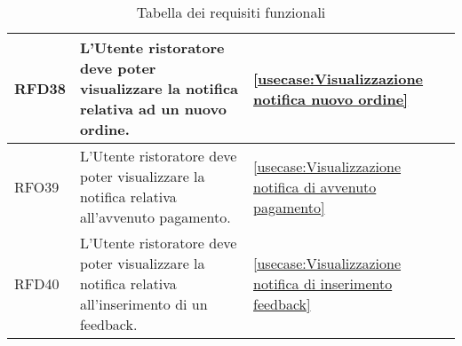 \begin{table}[H]
\begin{tabularx}{\textwidth}{l|X|p{2cm}}
		\hline
		RFD38       & L'Utente ristoratore deve poter visualizzare la notifica relativa ad un nuovo ordine.                   			 			&  \autoref{usecase:Visualizzazione notifica nuovo ordine}           \\
		\hline
		RFO39       & L'Utente ristoratore deve poter visualizzare la notifica relativa all'avvenuto pagamento.										&  \autoref{usecase:Visualizzazione notifica di avvenuto pagamento}           \\
		\hline
		RFD40       & L'Utente ristoratore deve poter visualizzare la notifica relativa all'inserimento di un feedback.                          	&  \autoref{usecase:Visualizzazione notifica di inserimento feedback}          \\
\end{tabularx}
\caption{Tabella dei requisiti funzionali}
\end{table}


